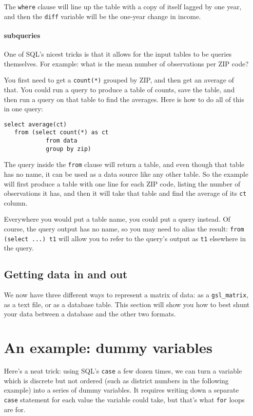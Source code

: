 The {\tt where} clause will line up the table with a copy of itself
lagged by one year, and then the {\tt diff} variable will be the
one-year change in income.


\paragraph{subqueries}

One of SQL's nicest tricks is that it allows for the input tables to be
queries themselves. For example: what is the mean number of observations per
ZIP code?

You first need to get a {\tt count(*)} grouped by ZIP, and then get an
average of that. You could run a query to produce a table of counts,
save the table, and then run a query on that table to find the averages.
Here is how to do all of this in one query: 
\begin{verbatim}
select average(ct) 
   from (select count(*) as ct
            from data
            group by zip)
\end{verbatim}
The query inside the {\tt from} clause will return a table, and even
though that table has no name, it can be used as a data source like any other
table. So the example will first produce a table with one line for each
ZIP code, listing the number of observations it has, and then it will
take that table and find the average of its {\tt ct} column.

Everywhere you would put a table name, you could put a query 
instead. Of course, the query output has no name, so you may need to
alias the result: {\tt from (select ...) t1} will allow you to refer to
the query's output as {\tt t1} elsewhere in the query.


\subsection{Getting data in and out}
We now have three different ways to represent a matrix of data: as a {\tt gsl\_matrix}, as a text file,
or as a database table. This section will show you how to best shunt your data between a database and
the other two formats.

\section{An example: dummy variables}
Here's a neat trick: using SQL's {\tt case} a few dozen times, we can turn a
variable which is discrete but not ordered (such as district numbers in the
following example) into a series of dummy variables. It requires writing down a
separate {\tt case} statement for each value the variable could take, but that's
what {\tt for} loops are for.

